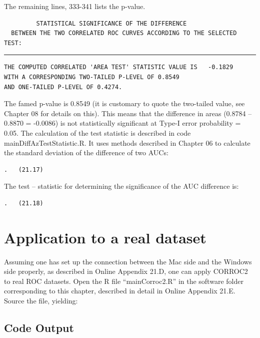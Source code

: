 \documentclass[
]{book}
\begin{document}
The remaining lines, 333-341 lists the p-value.

\begin{verbatim}
         STATISTICAL SIGNIFICANCE OF THE DIFFERENCE
  BETWEEN THE TWO CORRELATED ROC CURVES ACCORDING TO THE SELECTED TEST:
\end{verbatim}

\begin{center}\rule{0.5\linewidth}{0.5pt}\end{center}

\begin{verbatim}
THE COMPUTED CORRELATED 'AREA TEST' STATISTIC VALUE IS   -0.1829
WITH A CORRESPONDING TWO-TAILED P-LEVEL OF 0.8549
AND ONE-TAILED P-LEVEL OF 0.4274.
\end{verbatim}

The famed p-value is 0.8549 (it is customary to quote the two-tailed value, see Chapter 08 for details on this). This means that the difference in areas (0.8784 -- 0.8870 = -0.0086) is not statistically significant at Type-I error probability = 0.05. The calculation of the test statistic is described in code mainDiffAzTestStatistic.R. It uses methods described in Chapter 06 to calculate the standard deviation of the difference of two AUCs:

\begin{verbatim}
.   (21.17)
\end{verbatim}

The test -- statistic for determining the significance of the AUC difference is:

\begin{verbatim}
.   (21.18)
\end{verbatim}

\hypertarget{bivariate-binormal-model-corroc2-application}{%
\section{Application to a real dataset}\label{bivariate-binormal-model-corroc2-application}}

Assuming one has set up the connection between the Mac side and the Windows side properly, as described in Online Appendix 21.D, one can apply CORROC2 to real ROC datasets. Open the R file ``mainCorroc2.R'' in the software folder corresponding to this chapter, described in detail in Online Appendix 21.E. Source the file, yielding:

\hypertarget{bivariate-binormal-model-corroc2-application-code-output}{%
\subsection{Code Output}\label{bivariate-binormal-model-corroc2-application-code-output}}
\end{document}
